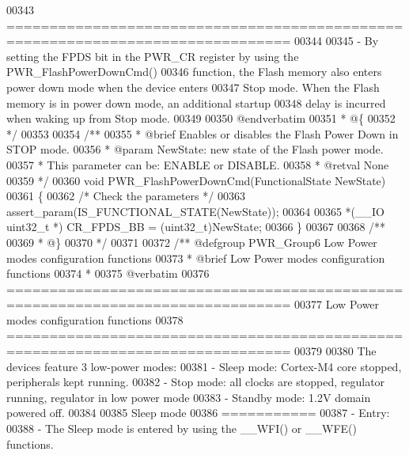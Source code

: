 \begin{DoxyCode}
00343 \textcolor{comment}{ ===============================================================================  }
00344 \textcolor{comment}{}
00345 \textcolor{comment}{ - By setting the FPDS bit in the PWR\_CR register by using the PWR\_FlashPowerDownCmd()}
00346 \textcolor{comment}{   function, the Flash memory also enters power down mode when the device enters }
00347 \textcolor{comment}{   Stop mode. When the Flash memory is in power down mode, an additional startup }
00348 \textcolor{comment}{   delay is incurred when waking up from Stop mode.}
00349 \textcolor{comment}{}
00350 \textcolor{comment}{@endverbatim}
00351 \textcolor{comment}{  * @\{}
00352 \textcolor{comment}{  */}
00353 
00354 \textcolor{comment}{/**}
00355 \textcolor{comment}{  * @brief  Enables or disables the Flash Power Down in STOP mode.}
00356 \textcolor{comment}{  * @param  NewState: new state of the Flash power mode.}
00357 \textcolor{comment}{  *          This parameter can be: ENABLE or DISABLE.}
00358 \textcolor{comment}{  * @retval None}
00359 \textcolor{comment}{  */}
00360 \textcolor{keywordtype}{void} PWR_FlashPowerDownCmd(FunctionalState NewState)
00361 \{
00362   \textcolor{comment}{/* Check the parameters */}
00363   assert_param(IS\_FUNCTIONAL\_STATE(NewState));
00364 
00365   *(\_\_IO uint32\_t *) CR_FPDS_BB = (uint32\_t)NewState;
00366 \}
00367 
00368 \textcolor{comment}{/**}
00369 \textcolor{comment}{  * @\}}
00370 \textcolor{comment}{  */}
00371 
00372 \textcolor{comment}{/** @defgroup PWR\_Group6 Low Power modes configuration functions}
00373 \textcolor{comment}{ *  @brief   Low Power modes configuration functions }
00374 \textcolor{comment}{ *}
00375 \textcolor{comment}{@verbatim   }
00376 \textcolor{comment}{ ===============================================================================}
00377 \textcolor{comment}{                    Low Power modes configuration functions}
00378 \textcolor{comment}{ ===============================================================================  }
00379 \textcolor{comment}{}
00380 \textcolor{comment}{  The devices feature 3 low-power modes:}
00381 \textcolor{comment}{   - Sleep mode: Cortex-M4 core stopped, peripherals kept running.}
00382 \textcolor{comment}{   - Stop mode: all clocks are stopped, regulator running, regulator in low power mode}
00383 \textcolor{comment}{   - Standby mode: 1.2V domain powered off.}
00384 \textcolor{comment}{   }
00385 \textcolor{comment}{   Sleep mode}
00386 \textcolor{comment}{   ===========}
00387 \textcolor{comment}{    - Entry:}
00388 \textcolor{comment}{      - The Sleep mode is entered by using the \_\_WFI() or \_\_WFE() functions.}

\end{DoxyCode}
